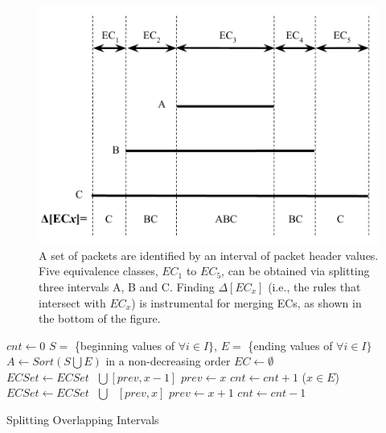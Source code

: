 \begin{figure}[t]
\centering
\includegraphics[scale=.52]{figures/DisjointECs.pdf}
\caption{A set of packets are identified by an interval of packet header values.
        Five equivalence classes, $EC_1$ to $EC_5$, can be obtained via splitting three intervals A, B and C.
        Finding $\Delta[EC_x]$ (i.e., the rules that intersect with $EC_x$) is instrumental for
        merging ECs, as shown in the bottom of the figure.}
\label{Fig:DisjointECsAsInterval}
\end{figure}

\begin{algorithm}[t]
\DontPrintSemicolon
{}
$cnt \gets 0$\;
$S = $ \{beginning values of $\forall i \in I\}$, $E = $ \{ending values of $\forall i \in I\}$\;
$A \gets Sort(S \bigcup E)$ in a non-decreasing order\;
$EC \gets \emptyset$\;
 {
         {
                 {\label{Alg:LineEndStart1}
                        $ECSet \gets ECSet \text{ }\bigcup \text{} [prev, x-1]$\;
                }\label{Alg:LineEndStart2}
                $prev \gets x$\;\label{Alg:LineNewPrev1}
                $cnt \gets cnt + 1$\;
        }
        \Else ($x \in E$) {
                $ECSet \gets ECSet \text{ } \bigcup \text{ } [prev, x]$\;\label{Alg:LineEndEnd}
                $prev \gets x + 1$\;\label{Alg:LineNewPrev2}
                $cnt \gets cnt - 1$\;
        }
}
\caption{Splitting Overlapping Intervals}
\label{Alg:GenDisjointECs}
\end{algorithm}


